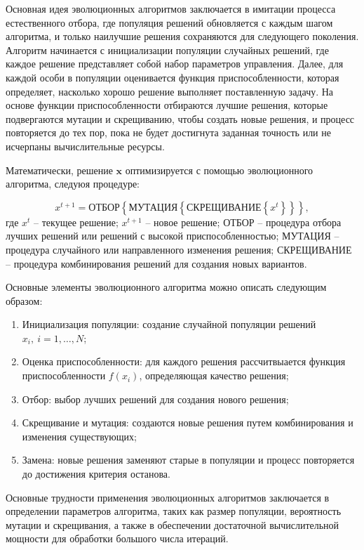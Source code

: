 Основная идея эволюционных алгоритмов заключается в имитации процесса естественного отбора,
где популяция решений обновляется с каждым шагом алгоритма, и только наилучшие решения
сохраняются для следующего поколения. Алгоритм начинается с инициализации популяции случайных
решений, где каждое решение представляет собой набор параметров управления. Далее, для каждой
особи в популяции оценивается функция приспособленности, которая определяет, насколько хорошо
решение выполняет поставленную задачу. На основе функции приспособленности отбираются лучшие
решения, которые подвергаются мутации и скрещиванию, чтобы создать новые решения, и процесс
повторяется до тех пор, пока не будет достигнута заданная точность или не исчерпаны
вычислительные ресурсы.

Математически, решение $\mathbf{x}$ оптимизируется с помощью эволюционного алгоритма, следуюя
процедуре:

\begin{equation*}
    x^{t+1} = \text{ОТБОР} \left\{
    \text{МУТАЦИЯ} \left\{
    \text{СКРЕЩИВАНИЕ} \left\{
    x^t
    \right\}
    \right\}
    \right\},
\end{equation*}
где $x^t$ -- текущее решение;
$x^{t+1}$ -- новое решение;
$\text{ОТБОР}$ -- процедура отбора лучших решений или решений с высокой приспособленностью;
$\text{МУТАЦИЯ}$ -- процедура случайного или направленного изменения решения;
$\text{СКРЕЩИВАНИЕ}$ -- процедура комбинирования решений для создания новых вариантов.

Основные элементы эволюционного алгоритма можно описать следующим образом:

\begin{enumerate}
    \item Инициализация популяции: создание случайной популяции решений $x_i,~i = 1, \ldots, N$;
    \item Оценка приспособленности: для каждого решения рассчитвыается функция приспособленности $f(x_i)$,
          определяющая качество решения;
    \item Отбор: выбор лучших решений для создания нового решения;
    \item Скрещивание и мутация: создаются новые решения путем комбинирования и изменения существующих;
    \item Замена: новые решения заменяют старые в популяции и процесс повторяется до достижения критерия останова.
\end{enumerate}

Основные трудности применения эволюционных алгоритмов заключается
в определении параметров алгоритма, таких как размер популяции, вероятность мутации и
скрещивания, а также в обеспечении достаточной вычислительной мощности для
обработки большого числа итераций.

